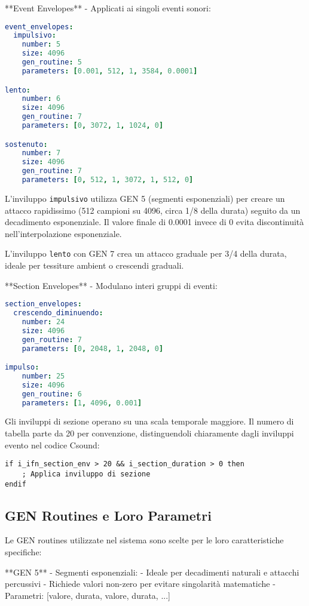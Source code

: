 **Event Envelopes** - Applicati ai singoli eventi sonori:

\begin{lstlisting}[language=Yaml]
event_envelopes:
  impulsivo:
    number: 5
    size: 4096
    gen_routine: 5
    parameters: [0.001, 512, 1, 3584, 0.0001]

lento:
    number: 6
    size: 4096
    gen_routine: 7
    parameters: [0, 3072, 1, 1024, 0]

sostenuto:
    number: 7
    size: 4096
    gen_routine: 7
    parameters: [0, 512, 1, 3072, 1, 512, 0]
\end{lstlisting}

L'inviluppo \texttt{impulsivo} utilizza GEN 5 (segmenti esponenziali) per creare un attacco rapidissimo (512 campioni su 4096, circa 1/8 della durata) seguito da un decadimento esponenziale. Il valore finale di 0.0001 invece di 0 evita discontinuità nell'interpolazione esponenziale.

L'inviluppo \texttt{lento} con GEN 7 crea un attacco graduale per 3/4 della durata, ideale per tessiture ambient o crescendi graduali.

**Section Envelopes** - Modulano interi gruppi di eventi:

\begin{lstlisting}[language=Yaml]
section_envelopes:
  crescendo_diminuendo:
    number: 24
    size: 4096
    gen_routine: 7
    parameters: [0, 2048, 1, 2048, 0]

impulso:
    number: 25
    size: 4096
    gen_routine: 6
    parameters: [1, 4096, 0.001]
\end{lstlisting}

Gli inviluppi di sezione operano su una scala temporale maggiore. Il numero di tabella parte da 20 per convenzione, distinguendoli chiaramente dagli inviluppi evento nel codice Csound:

\begin{lstlisting}[language=Csound]
if i_ifn_section_env > 20 && i_section_duration > 0 then
    ; Applica inviluppo di sezione
endif
\end{lstlisting}
\subsection{GEN Routines e Loro Parametri}
Le GEN routines utilizzate nel sistema sono scelte per le loro caratteristiche specifiche:

**GEN 5** - Segmenti esponenziali:
- Ideale per decadimenti naturali e attacchi percussivi
- Richiede valori non-zero per evitare singolarità matematiche
- Parametri: [valore, durata, valore, durata, ...]

